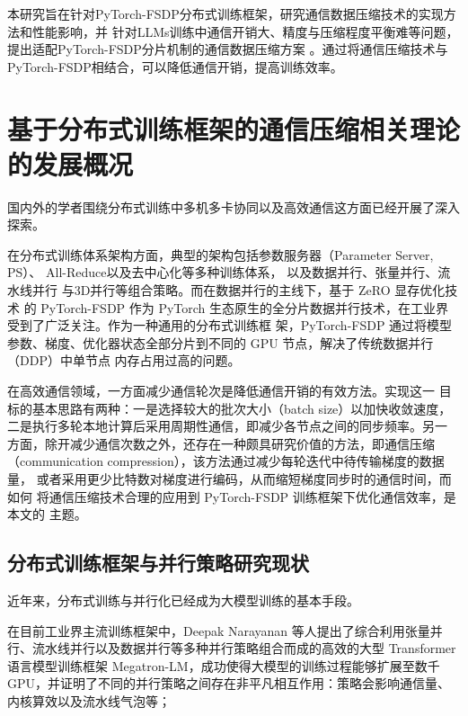 本研究旨在针对PyTorch-FSDP分布式训练框架，研究通信数据压缩技术的实现方法和性能影响，并
针对LLMs训练中通信开销大、精度与压缩程度平衡难等问题，提出适配PyTorch-FSDP分片机制的通信数据压缩方案
。通过将通信压缩技术与PyTorch-FSDP相结合，可以降低通信开销，提高训练效率。

\section{基于分布式训练框架的通信压缩相关理论的发展概况}

国内外的学者围绕分布式训练中多机多卡协同以及高效通信这方面已经开展了深入探索。

在分布式训练体系架构方面，典型的架构包括参数服务器（Parameter Server, PS）\cite{li2014scaling}、
All-Reduce\cite{gibiansky2017allreduce}以及去中心化\cite{luo2020prague}等多种训练体系，
以及数据并行\cite{luo2020prague}、张量并行、流水线并行\cite{huang2019gpipe,harlap2018pipedream}
与3D并行\cite{lai2023merak}等组合策略。而在数据并行的主线下，基于 ZeRO 显存优化技术\cite{rajbhandari2020zero}
的 PyTorch-FSDP 作为 PyTorch 生态原生的全分片数据并行技术，在工业界受到了广泛关注。作为一种通用的分布式训练框
架，PyTorch-FSDP 通过将模型参数、梯度、优化器状态全部分片到不同的 GPU 节点，解决了传统数据并行（DDP）中单节点
内存占用过高的问题。

在高效通信领域，一方面减少通信轮次是降低通信开销的有效方法。实现这一
目标的基本思路有两种：一是选择较大的批次大小（batch size）以加快收敛速度，
二是执行多轮本地计算后采用周期性通信，即减少各节点之间的同步频率。另一
方面，除开减少通信次数之外，还存在一种颇具研究价值的方法，即通信压缩
（communication compression），该方法通过减少每轮迭代中待传输梯度的数据量，
或者采用更少比特数对梯度进行编码，从而缩短梯度同步时的通信时间，而如何
将通信压缩技术合理的应用到 PyTorch-FSDP 训练框架下优化通信效率，是本文的
主题。

\subsection{分布式训练框架与并行策略研究现状}

近年来，分布式训练与并行化已经成为大模型训练的基本手段。

在目前工业界主流训练框架中，Deepak Narayanan 等人提出了综合利用张量并
行、流水线并行以及数据并行等多种并行策略组合而成的高效的大型 Transformer
语言模型训练框架 Megatron-LM，成功使得大模型的训练过程能够扩展至数千
GPU，并证明了不同的并行策略之间存在非平凡相互作用：策略会影响通信量、
内核算效以及流水线气泡等\cite{narayanan2021efficient}；

